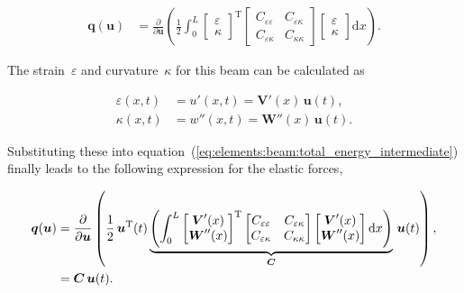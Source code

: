 \begin{align}
\boldsymbol{q}(\boldsymbol{u}) &= \frac{\partial}{\partial \boldsymbol{u}}\left(\frac{1}{2}\int_0^L
\begin{bmatrix}
\varepsilon\\
\kappa
\end{bmatrix}^\mathrm{T}
\begin{bmatrix}
C_{\varepsilon\varepsilon} & C_{\varepsilon\kappa}\\
C_{\varepsilon\kappa} & C_{\kappa\kappa}
\end{bmatrix}
\begin{bmatrix}
\varepsilon\\
\kappa
\end{bmatrix}
\mathrm{d}x\right).\label{eq:elements:beam:total_energy_intermediate}
\end{align}

The strain~$\varepsilon$ and curvature~$\kappa$ for this beam can be calculated as

\begin{align}
\varepsilon(x,t) &= u'(x,t) = \boldsymbol{V}'(x)\,\boldsymbol{u}(t),\\
\kappa(x,t) &= w''(x,t) = \boldsymbol{W}''(x)\,\boldsymbol{u}(t).
\end{align}

Substituting these into equation~(\ref{eq:elements:beam:total_energy_intermediate}) finally leads to the following expression for the elastic forces,

\begin{align}
\boldsymbol{q}(\boldsymbol{u}) &= \frac{\partial}{\partial \boldsymbol{u}}\left(\frac{1}{2}\,\boldsymbol{u}^\mathrm{T}(t)
\underbrace{
\left(
\int_0^L
\begin{bmatrix}
\boldsymbol{V}'(x)\\
\boldsymbol{W}''(x)
\end{bmatrix}^\mathrm{T}
\begin{bmatrix}
C_{\varepsilon\varepsilon} & C_{\varepsilon\kappa}\\
C_{\varepsilon\kappa} & C_{\kappa\kappa}
\end{bmatrix}
\begin{bmatrix}
\boldsymbol{V}'(x)\\
\boldsymbol{W}''(x)
\end{bmatrix}
\mathrm{d}x
\right)
}_{\boldsymbol{C}}
\,\boldsymbol{u}(t)\right),\notag\\
&= \boldsymbol{C}\,\boldsymbol{u}(t).
\end{align}

